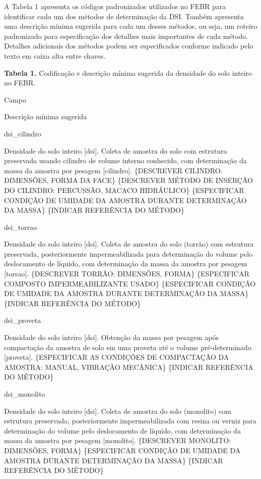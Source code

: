 \documentclass[
]{book}
\begin{document}
A Tabela 1 apresenta os códigos padronizados utilizados no FEBR para identificar cada um dos métodos de determinação da DSI. Também apresenta uma descrição mínima sugerida para cada um desses métodos, ou seja, um roteiro padronizado para especificação dos detalhes mais importantes de cada método. Detalhes adicionais dos métodos podem ser especificados conforme indicado pelo texto em caixa alta entre chaves.

\textbf{Tabela 1.} Codificação e descrição mínima sugerida da densidade do solo inteiro no FEBR.

Campo

Descrição mínima sugerida

dsi\_cilindro

Densidade do solo inteiro {[}dsi{]}. Coleta de amostra do solo com estrutura preservada usando cilindro de volume interno conhecido, com determinação da massa da amostra por pesagem {[}cilindro{]}. \{DESCREVER CILINDRO: DIMENSÕES, FORMA DA FACE\} \{DESCREVER MÉTODO DE INSERÇÃO DO CILINDRO: PERCUSSÃO, MACACO HIDRÁULICO\} \{ESPECIFICAR CONDIÇÃO DE UMIDADE DA AMOSTRA DURANTE DETERMINAÇÃO DA MASSA\} \{INDICAR REFERÊNCIA DO MÉTODO\}

dsi\_torrao

Densidade do solo inteiro {[}dsi{]}. Coleta de amostra do solo (torrão) com estrutura preservada, posteriormente impermeabilizada para determinação do volume pelo deslocamento de líquido, com determinação da massa da amostra por pesagem {[}torrao{]}. \{DESCREVER TORRÃO: DIMENSÕES, FORMA\} \{ESPECIFICAR COMPOSTO IMPERMEABILIZANTE USADO\} \{ESPECIFICAR CONDIÇÃO DE UMIDADE DA AMOSTRA DURANTE DETERMINAÇÃO DA MASSA\} \{INDICAR REFERÊNCIA DO MÉTODO\}

dsi\_proveta

Densidade do solo inteiro {[}dsi{]}. Obtenção da massa por pesagem após compactação da amostra de solo em uma proveta até o volume pré-determinado {[}proveta{]}. \{ESPECIFICAR AS CONDIÇÕES DE COMPACTAÇÃO DA AMOSTRA: MANUAL, VIBRAÇÃO MECÂNICA\} \{INDICAR REFERÊNCIA DO MÉTODO\}

dsi\_monolito

Densidade do solo inteiro {[}dsi{]}. Coleta de amostra do solo (monolito) com estrutura preservada, posteriormente impermeabilizada com resina ou verniz para determinação do volume pelo deslocamento de líquido, com determinação da massa da amostra por pesagem {[}monolito{]}. \{DESCREVER MONOLITO: DIMENSÕES, FORMA\} \{ESPECIFICAR CONDIÇÃO DE UMIDADE DA AMOSTRA DURANTE DETERMINAÇÃO DA MASSA\} \{INDICAR REFERÊNCIA DO MÉTODO\}
\end{document}
